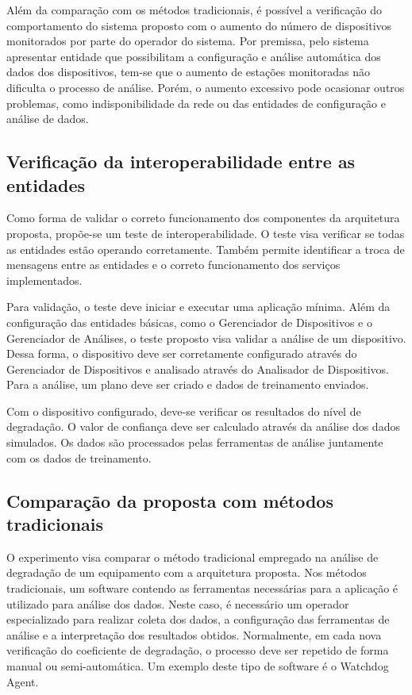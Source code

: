 Além da comparação com os métodos tradicionais, é possível a verificação do comportamento do sistema
proposto com o aumento do número de dispositivos monitorados por parte do operador do sistema. Por
premissa, pelo sistema apresentar entidade que possibilitam a configuração e análise automática dos
dados dos dispositivos, tem-se que o aumento de estações monitoradas não dificulta o processo de
análise. Porém, o aumento excessivo pode ocasionar outros problemas, como indisponibilidade da rede
ou das entidades de configuração e análise de dados.


\subsection{Verificação da interoperabilidade entre as entidades}
\label{sub:experimentos-interoperabilidade}

Como forma de validar o correto funcionamento dos componentes da arquitetura proposta, propõe-se um
teste de interoperabilidade. O teste visa verificar se todas as entidades estão operando
corretamente. Também permite identificar a troca de mensagens entre as entidades e o correto
funcionamento dos serviços implementados.

Para validação, o teste deve iniciar e executar uma aplicação mínima. Além da configuração das
entidades básicas, como o Gerenciador de Dispositivos e o Gerenciador de Análises, o teste proposto
visa validar a análise de um dispositivo. Dessa forma, o dispositivo deve ser corretamente
configurado através do Gerenciador de Dispositivos e analisado através do Analisador de
Dispositivos. Para a análise, um plano deve ser criado e dados de treinamento enviados.

Com o dispositivo configurado, deve-se verificar os resultados do nível de degradação. O valor de
confiança deve ser calculado através da análise dos dados simulados. Os dados são processados pelas
ferramentas de análise juntamente com os dados de treinamento.


\subsection{Comparação da proposta com métodos tradicionais}
\label{sub:experimentos-metodos-tradicionais}

O experimento visa comparar o método tradicional empregado na análise de degradação de um
equipamento com a arquitetura proposta. Nos métodos tradicionais, um software contendo as
ferramentas necessárias para a aplicação é utilizado para análise dos dados. Neste caso, é
necessário um operador especializado para realizar coleta dos dados, a configuração das ferramentas
de análise e a interpretação dos resultados obtidos. Normalmente, em cada nova verificação do
coeficiente de degradação, o processo deve ser repetido de forma manual ou semi-automática. Um
exemplo deste tipo de software é o Watchdog Agent.

